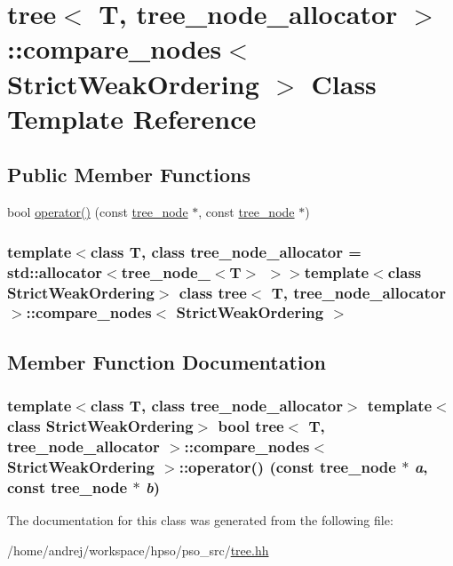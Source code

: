 \hypertarget{classtree_1_1compare__nodes}{
\section{tree$<$ T, tree\_\-node\_\-allocator $>$::compare\_\-nodes$<$ StrictWeakOrdering $>$ Class Template Reference}
\label{classtree_1_1compare__nodes}
}
\subsection*{Public Member Functions}
\begin{CompactItemize}
\item 
bool \hyperlink{classtree_1_1compare__nodes_78f17667ceb7cf6377dfa6f2c9733bd2}{operator()} (const \hyperlink{classtree__node__}{tree\_\-node} $\ast$, const \hyperlink{classtree__node__}{tree\_\-node} $\ast$)
\end{CompactItemize}
\subsubsection*{template$<$class T, class tree\_\-node\_\-allocator = std::allocator$<$tree\_\-node\_\-$<$T$>$ $>$$>$template$<$class StrictWeakOrdering$>$ class tree$<$ T, tree\_\-node\_\-allocator $>$::compare\_\-nodes$<$ StrictWeakOrdering $>$}



\subsection{Member Function Documentation}
\hypertarget{classtree_1_1compare__nodes_78f17667ceb7cf6377dfa6f2c9733bd2}{
\subsubsection{\setlength{\rightskip}{0pt plus 5cm}template$<$class T, class tree\_\-node\_\-allocator$>$ template$<$class StrictWeakOrdering$>$ bool {\bf tree}$<$ T, tree\_\-node\_\-allocator $>$::{\bf compare\_\-nodes}$<$ StrictWeakOrdering $>$::operator() (const {\bf tree\_\-node} $\ast$ {\em a}, \/  const {\bf tree\_\-node} $\ast$ {\em b})}}
\label{classtree_1_1compare__nodes_78f17667ceb7cf6377dfa6f2c9733bd2}




The documentation for this class was generated from the following file:\begin{CompactItemize}
\item 
/home/andrej/workspace/hpso/pso\_\-src/\hyperlink{tree_8hh}{tree.hh}\end{CompactItemize}
